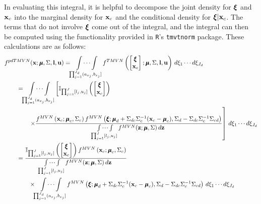 \documentclass[fleqn]{article}\usepackage[]{graphicx}\usepackage[]{color}
\newcommand{\ind}{\mathbb{I}}
\begin{document}
In evaluating this integral, it is helpful to decompose the joint density for $\bxi$ and ${\bf x}_c$ into the marginal density for ${\bf x}_c$ and the conditional density for $\bxi | \bx_c$.  The terms that do not involve $\bxi$ come out of the integral, and the integral can then be computed using the functionality provided in {\tt R}'s {\tt tmvtnorm} package.  These calculations are as follows:
\begin{align}
&f^{pdTMVN}(\bx ; \bmu, \Sigma, \bl, \bu) = \idotsint\limits_{\prod_{j=1}^{J_d} (a_{x_j}, b_{x_j}]} f^{TMVN}\left(\begin{bmatrix} \bxi \\ \bx_c \end{bmatrix}; \bmu, \Sigma, \bl, \bu\right) \, d \xi_1 \cdots d \xi_{J_d} \nonumber \\
&\qquad = \idotsint\limits_{\prod_{j=1}^{J_d} (a_{x_j}, b_{x_j}]} \left[ \ind_{\prod_{j=1}^J [l_j, u_j]}\left(\begin{bmatrix} \bxi \\ \bx_c \end{bmatrix}\right) \right. \nonumber \\
&\qquad \qquad \left. \times \frac{f^{MVN}\left(\bx_c; \bmu_c, \Sigma_c \right) f^{MVN}\left(\bxi; \bmu_d + \Sigma_{dc} \Sigma_c^{-1}(\bx_c - \bmu_c), \Sigma_d - \Sigma_{dc} \Sigma_{c}^{-1} \Sigma_{cd} \right)}{\idotsint\limits_{\prod_{j=1}^J [l_j, u_j]} f^{MVN}(\bz ; \bmu, \Sigma) \, d \bz } \right] \, d \xi_1 \cdots d \xi_{J_d} \nonumber \\
&\qquad = \frac{\ind_{\prod_{j=1}^J [l_j, u_j]}\left(\begin{bmatrix} \bxi \\ \bx_c \end{bmatrix}\right) f^{MVN}\left(\bx_c; \bmu_c, \Sigma_c \right)}{\idotsint\limits_{\prod_{j=1}^J [l_j, u_j]} f^{MVN}(\bz ; \bmu, \Sigma) \, d \bz } \nonumber \\
&\qquad \qquad \times \idotsint\limits_{\prod_{j=1}^{J_d} (a_{x_j}, b_{x_j}]} f^{MVN}\left(\bxi; \bmu_d + \Sigma_{dc} \Sigma_c^{-1}(\bx_c - \bmu_c), \Sigma_d - \Sigma_{dc} \Sigma_{c}^{-1} \Sigma_{cd} \right) \, d \xi_1 \cdots d \xi_{J_d} \label{eqn:evalDensityInTermsOfSigma}
\end{align}
\end{document}
